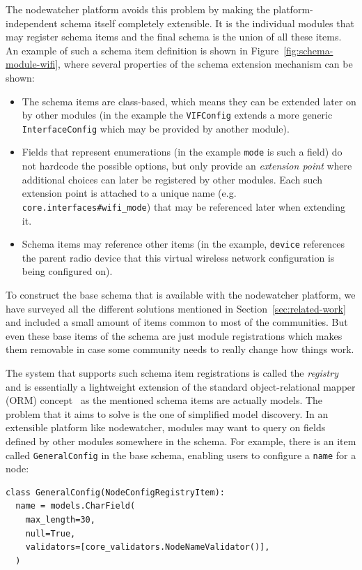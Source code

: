 \documentclass[5p,sort&compress]{elsarticle}
\begin{document}
The nodewatcher platform avoids this problem by making the platform-independent schema itself completely extensible.
It is the individual modules that may register schema items and the final schema is the union of all these items.
An example of such a schema item definition is shown in Figure~\ref{fig:schema-module-wifi}, where several properties of the schema extension mechanism can be shown:
\begin{itemize}
    \item The schema items are class-based, which means they can be extended later on by other modules (in the example the \texttt{VIFConfig} extends a more generic \texttt{InterfaceConfig} which may be provided by another module).
    \item Fields that represent enumerations (in the example \texttt{mode} is such a field) do not hardcode the possible options, but only provide an \textit{extension point} where additional choices can later be registered by other modules.
    Each such extension point is attached to a unique name (e.g. \texttt{core.interfaces\#wifi\_mode}) that may be referenced later when extending it.
    \item Schema items may reference other items (in the example, \texttt{device} references the parent radio device that this virtual wireless network configuration is being configured on).
\end{itemize}

To construct the base schema that is available with the nodewatcher platform, we have surveyed all the different solutions mentioned in Section~\ref{sec:related-work} and included a small amount of items common to most of the communities.
But even these base items of the schema are just module registrations which makes them removable in case some community needs to really change how things work.

The system that supports such schema item registrations is called the \textit{registry} and is essentially a lightweight extension of the standard object-relational mapper (ORM) concept~\cite{ONeil_2008} as the mentioned schema items are actually models.
The problem that it aims to solve is the one of simplified model discovery. In an extensible platform like nodewatcher, modules may want to query on fields defined by other modules somewhere in the schema. For example, there is an item called \texttt{GeneralConfig} in the base schema, enabling users to configure a \texttt{name} for a node:

\begin{verbatim}
class GeneralConfig(NodeConfigRegistryItem):
  name = models.CharField(
    max_length=30,
    null=True,
    validators=[core_validators.NodeNameValidator()],
  )
\end{verbatim}
\end{document}
